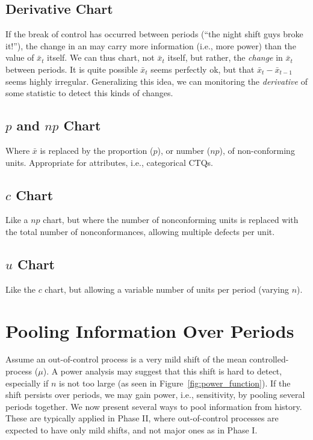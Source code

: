 \subsection{Derivative Chart}
If the break of control has occurred between periods (``the night shift guys broke it!''), the change in an \barxChart may carry more information (i.e., more power) than the value of $\bar{x}_t$ itself.
We can thus chart, not $\bar{x}_t$ itself, but rather, the \emph{change} in $\bar{x}_t$ between periods. 
It is quite possible $\bar{x}_t$ seems perfectly ok, but that $\bar{x}_t-\bar{x}_{t-1}$ seems highly irregular. 
Generalizing this idea, we can monitoring the \emph{derivative} of some statistic to detect this kinds of changes. 
\subsection{$p$ and $np$ Chart}
Where $\bar{x}$ is replaced by the proportion ($p$), or number ($np$), of non-conforming units.
Appropriate for attributes, i.e., categorical CTQs.
\subsection{$c$ Chart}
Like a $np$ chart, but where the number of nonconforming units is replaced with the total number of nonconformances, allowing multiple defects per unit. 
\subsection{$u$ Chart}
Like the $c$ chart, but allowing a variable number of units per period (varying $n$).





\section{Pooling Information Over Periods}
\label{sec:running_windows}

Assume an out-of-control process is a very mild shift of the mean controlled-process ($\mu$).
A power analysis may suggest that this shift is hard to detect, especially if $n$ is not too large (as seen in Figure~\ref{fig:power_function}).  
If the shift persists over periods, we may gain power, i.e., sensitivity, by pooling several periods together. 
We now present several ways to pool information from history. These are typically applied in Phase II, where out-of-control processes are expected to have only mild shifts, and not major ones as in Phase I. 

